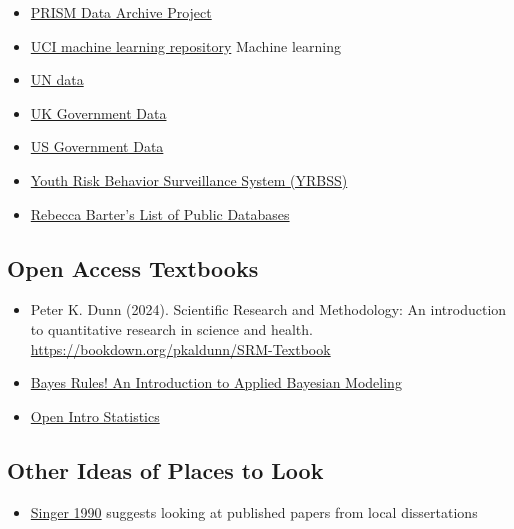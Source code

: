 \documentclass[
  letterpaper,
  DIV=11,
  numbers=noendperiod]{scrartcl}
\providecommand{\tightlist}{%
  \setlength{\itemsep}{0pt}\setlength{\parskip}{0pt}}\usepackage{longtable,booktabs,array}
\begin{document}
\begin{itemize}
  \href{https://statistics.gov.scot/home}{Open access to Scotland's
  official statistics}
\item
  \href{https://www.icpsr.umich.edu/icpsrweb/content/ICPSR/fenway.html}{PRISM
  Data Archive Project}
\item
  \href{https://archive.ics.uci.edu/}{UCI machine learning repository}
  Machine learning
\item
  \href{http://data.un.org/}{UN data}
\item
  \href{https://data.gov.uk/}{UK Government Data}
\item
  \href{https://sctyner.github.io/static/presentations/Misc/GraphicsGroupISU/2018-11-16-us-govt-data.html}{US
  Government Data}
\item
  \href{https://chronicdata.cdc.gov/Youth-Risk-Behaviors/DASH-Youth-Risk-Behavior-Surveillance-System-YRBSS/q6p7-56au}{Youth
  Risk Behavior Surveillance System (YRBSS)}
\item
  \href{https://rebeccabarter.com/blog/2023-03-28-data_sources}{Rebecca
  Barter's List of Public Databases}
\end{itemize}

\subsection{Open Access Textbooks}\label{open-access-textbooks}

\begin{itemize}
\tightlist
\item
  Peter K. Dunn (2024). Scientific Research and Methodology: An
  introduction to quantitative research in science and health.
  \url{https://bookdown.org/pkaldunn/SRM-Textbook}
\item
  \href{https://www.bayesrulesbook.com/}{Bayes Rules! An Introduction to
  Applied Bayesian Modeling}
\item
  \href{https://www.openintro.org/book/os/}{Open Intro Statistics}
\end{itemize}

\subsection{Other Ideas of Places to
Look}\label{other-ideas-of-places-to-look}

\begin{itemize}
\tightlist
\item
  \href{https://www.tandfonline.com/doi/abs/10.1080/00031305.1990.10475726}{Singer
  1990} suggests looking at published papers from local dissertations
\end{itemize}
\end{document}
